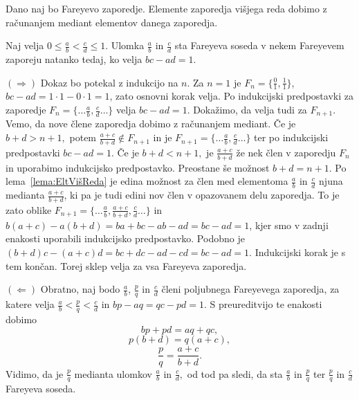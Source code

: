\documentclass[mat1]{fmfdelo}
\begin{document}
\begin{lema}
\label{lema:EltVišReda}
Dano naj bo Fareyevo zaporedje. Elemente zaporedja višjega reda dobimo z računanjem mediant elementov danega zaporedja.
\end{lema}

\begin{trditev}
Naj velja \( 0 \leq \frac{a}{b} < \frac{c}{d} \leq 1\). Ulomka $\frac{a}{b}$ in $\frac{c}{d}$ sta Fareyeva soseda v nekem Fareyevem zaporeju natanko tedaj, ko velja \(bc - ad = 1\).
\end{trditev}

\begin{dokaz}
$(\Rightarrow)$ Dokaz bo potekal z indukcijo na $n$.
Za $n=1$ je $F_n = \{\frac{0}{1}, \frac{1}{1}\}$, $bc - ad = 1\cdot1 - 0\cdot1 = 1$, zato osnovni korak velja.
Po indukcijski predpostavki za zaporedje \( F_n = \{\ldots \frac{a}{b}, \frac{c}{d} \ldots \} \) velja $bc - ad = 1$. Dokažimo, da velja tudi za $F_{n+1}$. Vemo, da nove člene zaporedja dobimo z računanjem mediant. Če je $b+d > n+1,$ potem $\frac{a+c}{b+d} \notin F_{n+1}$ in je \( F_{n+1} = \{\ldots \frac{a}{b}, \frac{c}{d} \ldots \} \) ter po indukcijski predpostavki $bc - ad = 1$. 
Če je $b+d < n+1,$ je $\frac{a+c}{b+d}$ že nek člen v zaporedju $F_n$ in uporabimo indukcijsko predpostavko. 
Preostane še možnost $b+d = n+1$. Po lema~\ref{lema:EltVišReda} je edina možnost za člen med elementoma $\frac{a}{b}$ in $\frac{c}{d}$ njuna medianta $\frac{a+c}{b+d}$, ki pa je tudi edini nov člen v opazovanem delu zaporedja. To je zato oblike \( F_{n+1} = \{\ldots \frac{a}{b}, \frac{a+c}{b+d}, \frac{c}{d} \ldots \} \) in $b(a + c) - a(b + d) = ba + bc - ab - ad = bc - ad = 1$, kjer smo v zadnji enakosti uporabili indukcijsko predpostavko. Podobno je $(b + d)c - (a + c)d = bc + dc - ad - cd = bc - ad = 1$. Indukcijski korak je s tem končan. Torej sklep velja za vsa Fareyeva zaporedja.

$(\Leftarrow)$ Obratno, naj bodo $\frac{a}{b}$, $\frac{p}{q}$ in $\frac{c}{d}$ členi poljubnega Fareyevega zaporedja, za katere velja $\frac{a}{b} <\frac{p}{q} < \frac{c}{d}$ in $bp - aq = qc - pd = 1$. S preureditvijo te enakosti dobimo
\[ bp + pd = aq + qc, \]
\[ p(b + d) = q(a + c), \]
\[ \frac{p}{q} = \frac{a+c}{b+d}. \]
Vidimo, da je $\frac{p}{q}$ medianta ulomkov $\frac{a}{b}$ in $\frac{c}{d},$ od tod pa sledi, da sta $\frac{a}{b}$ in $\frac{p}{q}$ ter $\frac{p}{q}$ in $\frac{c}{d}$ Fareyeva soseda.
\end{dokaz}
\end{document}

